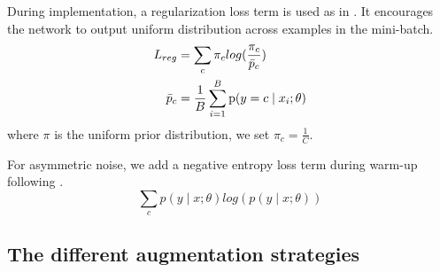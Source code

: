 \documentclass[letterpaper]{article} \usepackage{aaai23}  \usepackage{times}  \usepackage{helvet}  \usepackage{courier}  \usepackage[hyphens]{url}  \usepackage{graphicx} \urlstyle{rm} \def\UrlFont{\rm}  \usepackage{natbib}  \usepackage{caption} \frenchspacing  \setlength{\pdfpagewidth}{8.5in} \setlength{\pdfpageheight}{11in} \usepackage{algorithm}
\begin{document}
During implementation, a regularization loss term is used as in  \cite{tanaka2018joint,arazo2019unsupervised,li2020dividemix}. 
It encourages the network to output uniform distribution across examples in the mini-batch.
\begin{equation}
\begin{aligned}
    L_{reg}&=\sum_c \pi_c log(\frac{\pi_c}{\Bar{p}_c})\\
    \Bar{p}_c&=\frac{1}{B}\sum_{i=1}^B \text{p}(y=c\mid x_i;\theta)
\end{aligned}
\end{equation}
where $\pi$ is the uniform prior distribution, we set $\pi_c=\frac{1}{C}$. 

For asymmetric noise, we add a negative entropy loss term during warm-up following \cite{pereyra2017regularizing,li2020dividemix}.
\begin{equation}
\sum_c p(y\mid x;\theta)log(p(y\mid x;\theta))
\end{equation}

\subsection{The different augmentation strategies} \label{sectionaug}
\end{document}
